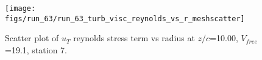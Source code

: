 \begin{figure}[H]
\centering
\texttt{[image: figs/run\_63/run\_63\_turb\_visc\_reynolds\_vs\_r\_meshscatter]}
\caption{Scatter plot of $
u_T$ reynolds stress term vs radius at $z/c$=10.00, $V_{free}$=19.1, station 7.}
\label{fig:run_63_turb_visc_reynolds_vs_r_meshscatter}
\end{figure}



